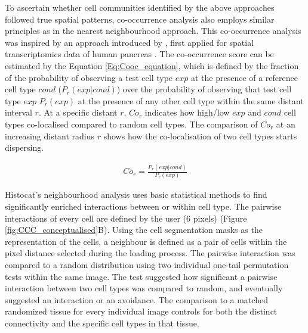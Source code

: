 To ascertain whether cell communities identified by the above approaches followed true spatial patterns, co-occurrence analysis also employs similar principles as in the nearest neighbourhood approach. This co-occurrence analysis was inspired by an approach introduced by \cite{tosti2021single}, first applied for spatial transcriptomics data of human pancreas \cite{tosti2021single}. The co-occurrence score can be estimated by the Equation \ref{Eq:Cooc_equation}, which is defined by the fraction of the probability of observing a test cell type $exp$ at the presence of a reference cell type $cond$ ($P_{r}(exp|cond)$) over the probability of observing that test cell type $exp$ $P_{r}(exp)$ at the presence of any other cell type within the same distant interval $r$. At a specific distant $r$, $Co_{r}$ indicates how high/low $exp$ and $cond$ cell types co-localised compared to random cell types. The comparison of $Co_{r}$ at an increasing distant radius $r$ shows how the co-localisation of two cell types starts dispersing.


\begin{align}
\label{Eq:Cooc_equation}
Co_{r} = \frac{P_{r}(exp|cond)}{P_{r}(exp)} 
\end{align}

Histocat's neighbourhood analysis uses  basic statistical methods to find significantly enriched interactions between or within cell type. The pairwise interactions of every cell are defined by the user (6 pixels) (Figure \ref{fig:CCC_conceptualised}B). Using the cell segmentation masks as the representation of the cells, a neighbour is defined as a pair of cells within the pixel distance selected during the loading process. The pairwise interaction was compared to a random distribution using two individual one-tail permutation tests within the same image. The test suggested how significant a pairwise interaction between two cell types was compared to random, and eventually suggested an interaction or an avoidance. The comparison to a matched randomized tissue for every individual image controls for both the distinct connectivity and the specific cell types in that tissue. 

